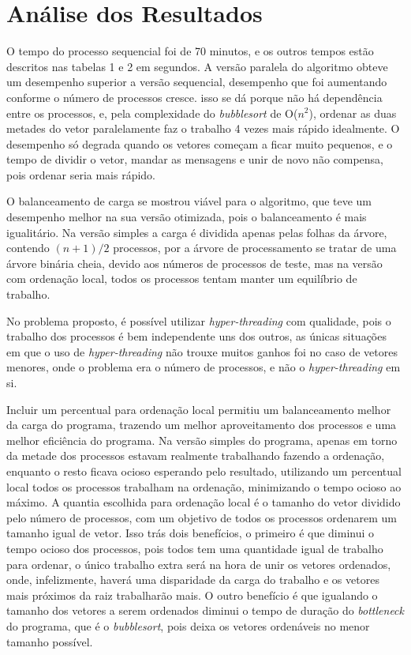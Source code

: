 \section{Análise dos Resultados}

O tempo do processo sequencial foi de 70 minutos, e os outros tempos estão descritos nas tabelas 1 e 2 em segundos. A versão paralela do algoritmo obteve um desempenho superior a versão sequencial, desempenho que foi aumentando conforme o número de processos cresce. isso se dá porque não há dependência entre os processos, e, pela complexidade do \emph{bubblesort} de O($n^{2}$), ordenar as duas metades do vetor paralelamente faz o trabalho 4 vezes mais rápido idealmente. O desempenho só degrada quando os vetores começam a ficar muito pequenos, e o tempo de dividir o vetor, mandar as mensagens e unir de novo não compensa, pois ordenar seria mais rápido.

O balanceamento de carga se mostrou viável para o algoritmo, que teve um desempenho melhor na sua versão otimizada, pois o balanceamento é mais igualitário. Na versão simples a carga é dividida apenas pelas folhas da árvore, contendo $(n + 1) / 2$ processos, por a árvore de processamento se tratar de uma árvore binária cheia, devido aos números de processos de teste, mas na versão com ordenação local, todos os processos tentam manter um equilíbrio de trabalho.

No problema proposto, é possível utilizar \emph{hyper-threading} com qualidade, pois o trabalho dos processos é bem independente uns dos outros, as únicas situações em que o uso de \emph{hyper-threading} não trouxe muitos ganhos foi no caso de vetores menores, onde o problema era o número de processos, e não o \emph{hyper-threading} em si.

Incluir um percentual para ordenação local permitiu um balanceamento melhor da carga do programa, trazendo um melhor aproveitamento dos processos e uma melhor eficiência do programa. Na versão simples do programa, apenas em torno da metade dos processos estavam realmente trabalhando fazendo a ordenação, enquanto o resto ficava ocioso esperando pelo resultado, utilizando um percentual local todos os processos trabalham na ordenação, minimizando o tempo ocioso ao máximo. A quantia escolhida para ordenação local é o tamanho do vetor dividido pelo número de processos, com um objetivo de todos os processos ordenarem um tamanho igual de vetor. Isso trás dois benefícios, o primeiro é que diminui o tempo ocioso dos processos, pois todos tem uma quantidade igual de trabalho para ordenar, o único trabalho extra será na hora de unir os vetores ordenados, onde, infelizmente, haverá uma disparidade da carga do trabalho e os vetores mais próximos da raiz trabalharão mais. O outro benefício é que igualando o tamanho dos vetores a serem ordenados diminui o tempo de duração do \emph{bottleneck} do programa, que é o \emph{bubblesort}, pois deixa os vetores ordenáveis no menor tamanho possível.